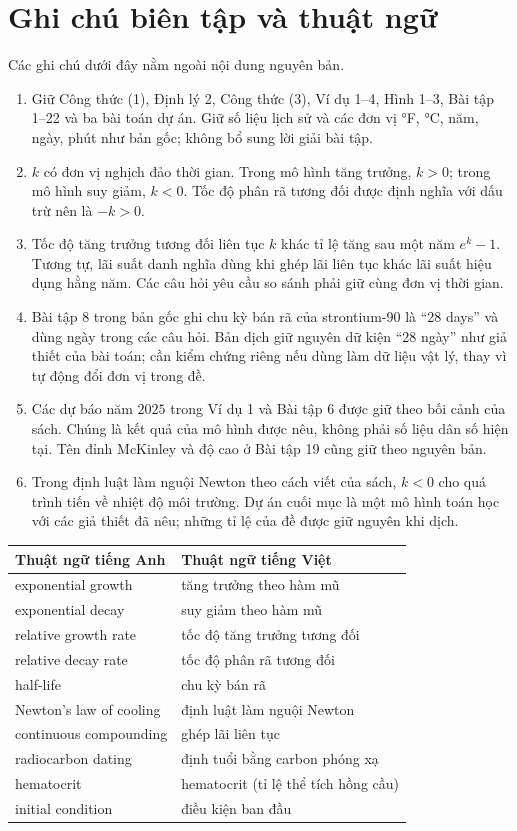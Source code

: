 \documentclass[12pt,a4paper]{article}
\begin{document}
\section*{Ghi chú biên tập và thuật ngữ}
Các ghi chú dưới đây nằm ngoài nội dung nguyên bản.
\begin{enumerate}[leftmargin=*]
\item Giữ Công thức (1), Định lý 2, Công thức (3), Ví dụ 1–4, Hình 1–3, Bài tập 1–22 và ba bài toán dự án. Giữ số liệu lịch sử và các đơn vị °F, °C, năm, ngày, phút như bản gốc; không bổ sung lời giải bài tập.
\item $k$ có đơn vị nghịch đảo thời gian. Trong mô hình tăng trưởng, $k>0$; trong mô hình suy giảm, $k<0$. Tốc độ phân rã tương đối được định nghĩa với dấu trừ nên là $-k>0$.
\item Tốc độ tăng trưởng tương đối liên tục $k$ khác tỉ lệ tăng sau một năm $e^k-1$. Tương tự, lãi suất danh nghĩa dùng khi ghép lãi liên tục khác lãi suất hiệu dụng hằng năm. Các câu hỏi yêu cầu so sánh phải giữ cùng đơn vị thời gian.
\item Bài tập 8 trong bản gốc ghi chu kỳ bán rã của strontium-90 là “28 days” và dùng ngày trong các câu hỏi. Bản dịch giữ nguyên dữ kiện “28 ngày” như giả thiết của bài toán; cần kiểm chứng riêng nếu dùng làm dữ liệu vật lý, thay vì tự động đổi đơn vị trong đề.
\item Các dự báo năm $2025$ trong Ví dụ 1 và Bài tập 6 được giữ theo bối cảnh của sách. Chúng là kết quả của mô hình được nêu, không phải số liệu dân số hiện tại. Tên đỉnh McKinley và độ cao ở Bài tập 19 cũng giữ theo nguyên bản.
\item Trong định luật làm nguội Newton theo cách viết của sách, $k<0$ cho quá trình tiến về nhiệt độ môi trường. Dự án cuối mục là một mô hình toán học với các giả thiết đã nêu; những tỉ lệ của đề được giữ nguyên khi dịch.
\end{enumerate}
\begin{longtable}{p{.43\linewidth}p{.49\linewidth}}\toprule
Thuật ngữ tiếng Anh & Thuật ngữ tiếng Việt\\\midrule
exponential growth & tăng trưởng theo hàm mũ\\
exponential decay & suy giảm theo hàm mũ\\
relative growth rate & tốc độ tăng trưởng tương đối\\
relative decay rate & tốc độ phân rã tương đối\\
half-life & chu kỳ bán rã\\
Newton's law of cooling & định luật làm nguội Newton\\
continuous compounding & ghép lãi liên tục\\
radiocarbon dating & định tuổi bằng carbon phóng xạ\\
hematocrit & hematocrit (tỉ lệ thể tích hồng cầu)\\
initial condition & điều kiện ban đầu\\\bottomrule
\end{longtable}
\end{document}
